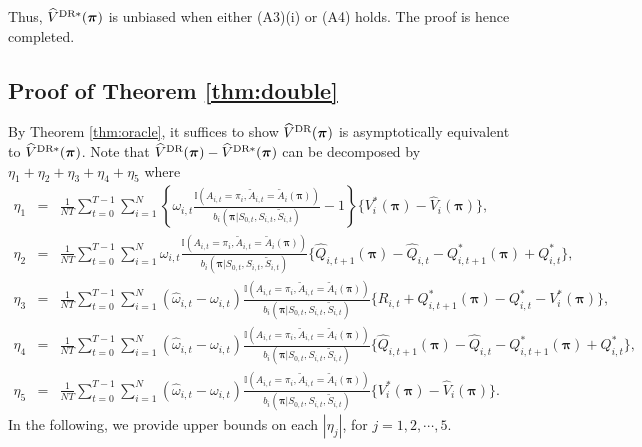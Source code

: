 \documentclass{article}
\begin{document}
Thus, $\widehat{V}^{\hbox{\scriptsize{DR}}*}(\bm{\pi})$ is unbiased when either (A3)(i) or (A4) holds. The proof is hence completed. 

\subsection{Proof of Theorem \ref{thm:double}}
By Theorem \ref{thm:oracle}, it suffices to show $\widehat{V}^{\hbox{\scriptsize{DR}}}(\bm{\pi})$ is asymptotically equivalent to $\widehat{V}^{\hbox{\scriptsize{DR}}*}(\bm{\pi})$. Note that $\widehat{V}^{\hbox{\scriptsize{DR}}}(\bm{\pi})-\widehat{V}^{\hbox{\scriptsize{DR}}*}(\bm{\pi})$ can be decomposed by $\eta_1+\eta_2+\eta_3+\eta_4+\eta_5$ where
\begin{eqnarray*}
	\eta_1&=&	\frac{1}{NT}\sum_{t=0}^{T-1}\sum_{i=1}^N \left\{\omega_{i,t}\frac{\mathbb{I}(A_{i,t}=\pi_i,\widetilde{A}_{i,t}=\widetilde{A}_i(\bm{\pi}))}{b_i(\bm{\pi}|S_{0,t},S_{i,t},\widetilde{S}_{i,t})}-1\right\}\{V_i^*(\bm{\pi})- \widehat{V}_i(\bm{\pi}) \},\\
	\eta_2&=&%
	\frac{1}{NT}\sum_{t=0}^{T-1}\sum_{i=1}^N \omega_{i,t}\frac{\mathbb{I}(A_{i,t}=\pi_i,\widetilde{A}_{i,t}=\widetilde{A}_i(\bm{\pi}))}{b_i(\bm{\pi}|S_{0,t},S_{i,t},\widetilde{S}_{i,t})}\{\widehat{Q}_{i,t+1}(\bm{\pi})-\widehat{Q}_{i,t}-Q_{i,t+1}^*(\bm{\pi})+Q_{i,t}^* \},\\
	\eta_3&=&\frac{1}{NT}\sum_{t=0}^{T-1}\sum_{i=1}^N (\widehat{\omega}_{i,t}-\omega_{i,t})\frac{\mathbb{I}(A_{i,t}=\pi_i,\widetilde{A}_{i,t}=\widetilde{A}_i(\bm{\pi}))}{b_i(\bm{\pi}|S_{0,t},S_{i,t},\widetilde{S}_{i,t})}
	\{R_{i,t}+Q_{i,t+1}^*(\bm{\pi})-Q_{i,t}^*-V_i^*(\bm{\pi})\},\\
	\eta_4&=&\frac{1}{NT}\sum_{t=0}^{T-1}\sum_{i=1}^N (\widehat{\omega}_{i,t}-\omega_{i,t})\frac{\mathbb{I}(A_{i,t}=\pi_i,\widetilde{A}_{i,t}=\widetilde{A}_i(\bm{\pi}))}{b_i(\bm{\pi}|S_{0,t},S_{i,t},\widetilde{S}_{i,t})}\{\widehat{Q}_{i,t+1}(\bm{\pi})-\widehat{Q}_{i,t}-Q_{i,t+1}^*(\bm{\pi})+Q_{i,t}^* \},\\
	\eta_5&=&\frac{1}{NT}\sum_{t=0}^{T-1}\sum_{i=1}^N (\widehat{\omega}_{i,t}-\omega_{i,t})\frac{\mathbb{I}(A_{i,t}=\pi_i,\widetilde{A}_{i,t}=\widetilde{A}_i(\bm{\pi}))}{b_i(\bm{\pi}|S_{0,t},S_{i,t},\widetilde{S}_{i,t})}\{V_i^*(\bm{\pi})-\widehat{V}_i(\bm{\pi}) \}.
\end{eqnarray*}
In the following, we provide upper bounds on each $|\eta_j|$, for $j=1,2,\cdots,5$. 
\end{document}
